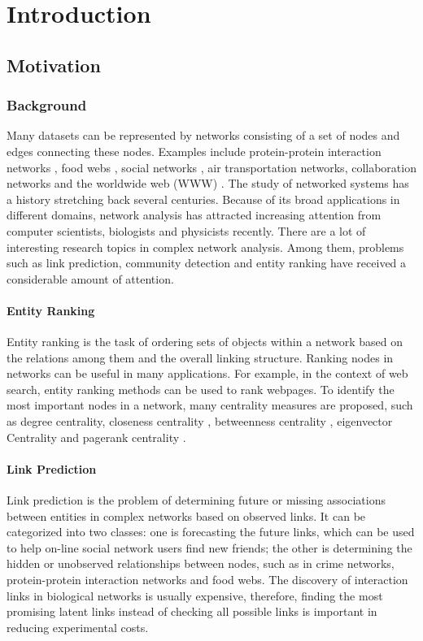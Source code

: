 \documentclass[\main/thesis.tex]{subfiles}
\begin{document}
\chapter{Introduction}

\section{Motivation}
\subsection{Background} \label{background}
Many datasets can be represented by networks consisting of a set of nodes and edges connecting these nodes. Examples include protein-protein interaction networks \cite{krogan2006global}, food webs \cite{williams2000simple}, social networks \cite{shetty2004enron}, air transportation networks, collaboration networks \cite{nascimento2003analysis,leskovec2007graph} and the worldwide web (WWW) \cite{albert1999internet,broder2000graph}. The study of networked systems has a history stretching back several centuries. Because of its broad applications in different domains, network analysis has attracted increasing attention from computer scientists, biologists and physicists recently. There are a lot of interesting research topics in complex network analysis. Among them, problems such as link prediction, community detection and entity ranking have received a considerable amount of attention.

\subsubsection{Entity Ranking}
Entity ranking is the task of ordering sets of objects within a network based on the relations among them and the overall linking structure. Ranking nodes in networks can be useful in many applications. For example, in the context of web search, entity ranking methods can be used to rank webpages. To identify the most important nodes in a network, many centrality measures are proposed, such as degree centrality, closeness centrality \cite{freeman1978centrality}, betweenness centrality \cite{freeman1977set}, eigenvector Centrality \cite{bonacich1987power} and pagerank centrality \cite{page1999pagerank}.

\subsubsection{Link Prediction}
Link prediction is the problem of determining future or missing associations between entities in complex networks based on observed links. It can be categorized into two classes: one is forecasting the future links, which can be used to help on-line social network users find new friends; the other is determining the hidden or unobserved relationships between nodes, such as in crime networks, protein-protein interaction networks and food webs. The discovery of interaction links in biological networks is usually expensive, therefore, finding the most promising latent links instead of checking all possible links is important in reducing experimental costs.
\end{document}
